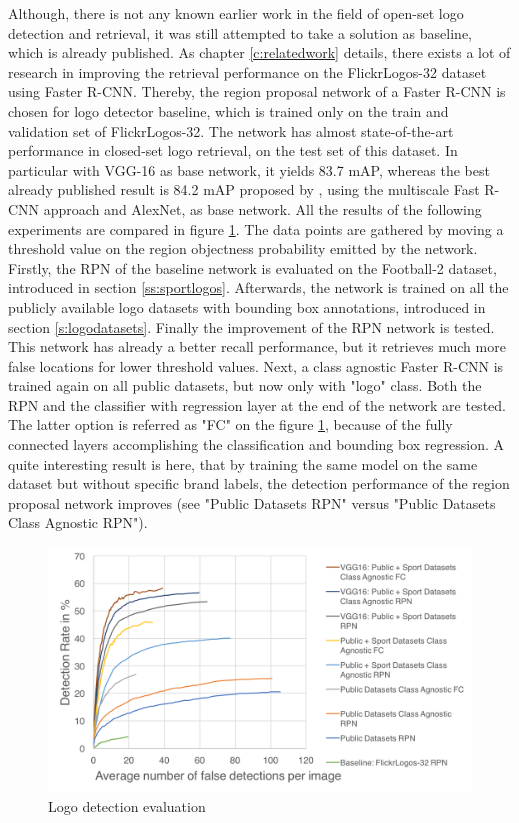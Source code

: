 Although, there is not any known earlier work in the field of open-set logo detection and retrieval, it was still attempted to take a solution as baseline, which is already published. As chapter \ref{c:relatedwork} details, there exists a lot of research in improving the retrieval performance on the FlickrLogos-32 dataset using Faster R-CNN. Thereby, the region proposal network of a Faster R-CNN is chosen for logo detector baseline, which is trained only on the train and validation set of FlickrLogos-32. The network has almost state-of-the-art performance in closed-set logo retrieval, on the test set of this dataset. In particular with VGG-16 as base network, it yields 83.7 mAP, whereas the best already published result is 84.2 mAP proposed by \cite{Bao:2016:RCL:3007669.3007728}, using the multiscale Fast R-CNN approach and AlexNet, as base network.
\bigbreak
All the results of the following experiments are compared in figure \ref{f:detectioneval}. The data points are gathered by moving a threshold value on the region objectness probability emitted by the network.
Firstly, the RPN of the baseline network is evaluated on the Football-2 dataset, introduced in section \ref{ss:sportlogos}. Afterwards, the network is trained on all the publicly available logo datasets with bounding box annotations, introduced in section \ref{s:logodatasets}. Finally the improvement of the RPN network is tested. This network has already a better recall performance, but it retrieves much more false locations for lower threshold values.
Next, a class agnostic Faster R-CNN is trained again on all public datasets, but now only with "logo" class. Both the RPN and the classifier with regression layer at the end of the network are tested. The latter option is referred as "FC" on the figure \ref{f:detectioneval}, because of the fully connected layers accomplishing the classification and bounding box regression. A quite interesting result is here, that by training the same model on the same dataset but without specific brand labels, the detection performance of the region proposal network improves (see "Public Datasets RPN" versus "Public Datasets Class Agnostic RPN").

\begin{figure}
  \centering
  \includegraphics[width=120mm]{images/mt/logodetection.png}
  \caption{Logo detection evaluation}
  \label{f:detectioneval}
\end{figure}


